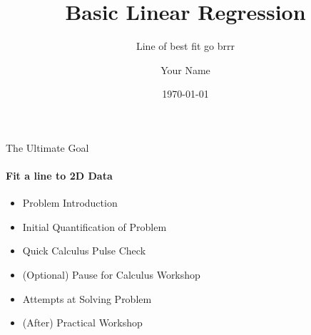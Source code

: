 \documentclass[aspectratio=169,t]{beamer}
\title[Basic Linear Regression]{Basic Linear Regression}
\subtitle{Line of best fit go brrr}
\author[Your Name]{Your Name}
\institute{}
\date{\today}
\begin{document}
\begin{frame}[plain]
  \titlepage
\end{frame}

\begin{frame}{The Ultimate Goal}
  \framesubtitle{Fit a line to 2D Data}
  \begin{itemize}[<+->]
    \item Problem Introduction
    \item Initial Quantification of Problem
    \item Quick Calculus Pulse Check
    \item (Optional) Pause for Calculus Workshop
    \item Attempts at Solving Problem
    \item (After) Practical Workshop
  \end{itemize}
\end{frame}

\end{document}
